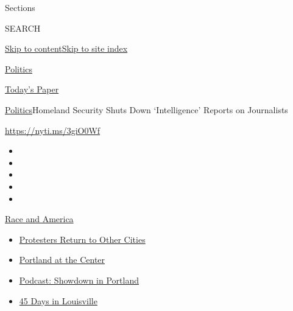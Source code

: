 Sections

SEARCH

\protect\hyperlink{site-content}{Skip to
content}\protect\hyperlink{site-index}{Skip to site index}

\href{https://www.nytimes.com/section/politics}{Politics}

\href{https://myaccount.nytimes.com/auth/login?response_type=cookie\&client_id=vi}{}

\href{https://www.nytimes.com/section/todayspaper}{Today's Paper}

\href{/section/politics}{Politics}\textbar{}Homeland Security Shuts Down
`Intelligence' Reports on Journalists

\url{https://nyti.ms/3giO0Wf}

\begin{itemize}
\item
\item
\item
\item
\item
\end{itemize}

\href{https://www.nytimes.com/news-event/george-floyd-protests-minneapolis-new-york-los-angeles?action=click\&pgtype=Article\&state=default\&region=TOP_BANNER\&context=storylines_menu}{Race
and America}

\begin{itemize}
\tightlist
\item
  \href{https://www.nytimes.com/2020/07/26/us/protests-portland-seattle-trump.html?action=click\&pgtype=Article\&state=default\&region=TOP_BANNER\&context=storylines_menu}{Protesters
  Return to Other Cities}
\item
  \href{https://www.nytimes.com/2020/07/24/us/portland-oregon-protests-white-race.html?action=click\&pgtype=Article\&state=default\&region=TOP_BANNER\&context=storylines_menu}{Portland
  at the Center}
\item
  \href{https://www.nytimes.com/2020/07/23/podcasts/the-daily/portland-protests.html?action=click\&pgtype=Article\&state=default\&region=TOP_BANNER\&context=storylines_menu}{Podcast:
  Showdown in Portland}
\item
  \href{https://www.nytimes.com/interactive/2020/07/16/us/black-lives-matter-protests-louisville-breonna-taylor.html?action=click\&pgtype=Article\&state=default\&region=TOP_BANNER\&context=storylines_menu}{45
  Days in Louisville}
\end{itemize}

